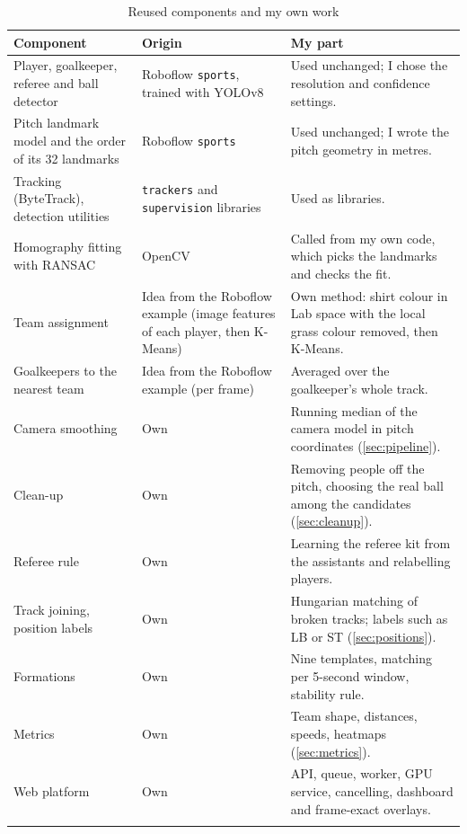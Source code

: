 \begin{longtable}{|p{}|p{}|p{}|}
	\hline
	\textbf{Component} & \textbf{Origin} & \textbf{My part} \\
	\hline
	\endhead
	Player, goalkeeper, referee and ball detector & Roboflow \texttt{sports}, trained with YOLOv8 & Used unchanged; I chose the resolution and confidence settings. \\
	\hline
	Pitch landmark model and the order of its 32 landmarks & Roboflow \texttt{sports} & Used unchanged; I wrote the pitch geometry in metres. \\
	\hline
	Tracking (ByteTrack), detection utilities & \texttt{trackers} and \texttt{supervision} libraries & Used as libraries. \\
	\hline
	Homography fitting with RANSAC & OpenCV & Called from my own code, which picks the landmarks and checks the fit. \\
	\hline
	Team assignment & Idea from the Roboflow example (image features of each player, then K-Means) & Own method: shirt colour in Lab space with the local grass colour removed, then K-Means. \\
	\hline
	Goalkeepers to the nearest team & Idea from the Roboflow example (per frame) & Averaged over the goalkeeper's whole track. \\
	\hline
	Camera smoothing & Own & Running median of the camera model in pitch coordinates (\autoref{sec:pipeline}). \\
	\hline
	Clean-up & Own & Removing people off the pitch, choosing the real ball among the candidates (\autoref{sec:cleanup}). \\
	\hline
	Referee rule & Own & Learning the referee kit from the assistants and relabelling players. \\
	\hline
	Track joining, position labels & Own & Hungarian matching of broken tracks; labels such as LB or ST (\autoref{sec:positions}). \\
	\hline
	Formations & Own & Nine templates, matching per 5-second window, stability rule. \\
	\hline
	Metrics & Own & Team shape, distances, speeds, heatmaps (\autoref{sec:metrics}). \\
	\hline
	Web platform & Own & API, queue, worker, GPU service, cancelling, dashboard and frame-exact overlays. \\
	\hline
	\caption{Reused components and my own work}
	\label{tab:reuse}
\end{longtable}

